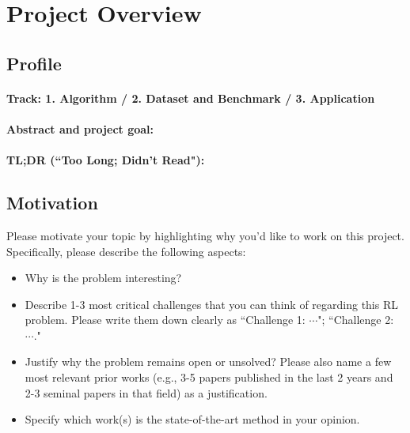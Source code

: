 \section{Project Overview}
\label{section:intro}

\subsection{Profile}

\paragraph{Track: 1. Algorithm / 2. Dataset and Benchmark / 3. Application}

\paragraph{Abstract and project goal:}

\paragraph{TL;DR (``Too Long; Didn't Read"):}

\subsection{Motivation}
Please motivate your topic by highlighting why you'd like to work on this project. Specifically, please describe the following aspects: 
\begin{itemize}
    \item Why is the problem interesting?
    \item Describe 1-3 most critical challenges that you can think of regarding this RL problem. Please write them down clearly as ``Challenge 1: $\cdots$"; ``Challenge 2: $\cdots$."
    \item Justify why the problem remains open or unsolved? Please also name a few most relevant prior works (e.g., 3-5 papers published in the last 2 years and 2-3 seminal papers in that field) as a justification. 
    \item Specify which work(s) is the state-of-the-art method in your opinion.
\end{itemize}


